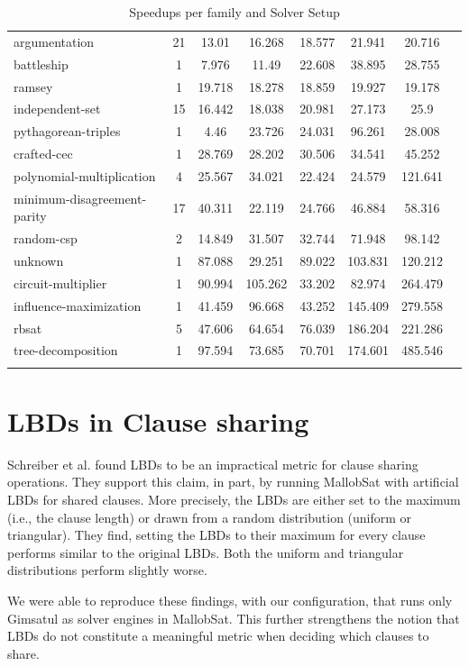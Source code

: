 \documentclass[12pt,a4paper,twoside]{scrartcl}
\numberwithin{equation}{section}
\begin{document}
\begin{longtable}{ lccccccc }
  argumentation	&	21	&	13.01	&	16.268	&	18.577	&	21.941	&	20.716	\\
  battleship	&	1	&	7.976	&	11.49	&	22.608	&	38.895	&	28.755	\\
  ramsey	&	1	&	19.718	&	18.278	&	18.859	&	19.927	&	19.178	\\
  independent-set	&	15	&	16.442	&	18.038	&	20.981	&	27.173	&	25.9	\\
  pythagorean-triples	&	1	&	4.46	&	23.726	&	24.031	&	96.261	&	28.008	\\
  crafted-cec	&	1	&	28.769	&	28.202	&	30.506	&	34.541	&	45.252	\\
  polynomial-multiplication	&	4	&	25.567	&	34.021	&	22.424	&	24.579	&	121.641	\\
  minimum-disagreement-parity	&	17	&	40.311	&	22.119	&	24.766	&	46.884	&	58.316	\\
  random-csp	&	2	&	14.849	&	31.507	&	32.744	&	71.948	&	98.142	\\
  unknown	&	1	&	87.088	&	29.251	&	89.022	&	103.831	&	120.212	\\
  circuit-multiplier	&	1	&	90.994	&	105.262	&	33.202	&	82.974	&	264.479	\\
  influence-maximization	&	1	&	41.459	&	96.668	&	43.252	&	145.409	&	279.558	\\
  rbsat	&	5	&	47.606	&	64.654	&	76.039	&	186.204	&	221.286	\\
  tree-decomposition	&	1	&	97.594	&	73.685	&	70.701	&	174.601	&	485.546	\\
  \bottomrule
  \caption{Speedups per family and Solver Setup}
  \label{tab:speedupsFamiliesComplete}
\end{longtable}

\section{LBDs in Clause sharing}

Schreiber et al. \cite{searchOnlyPaper} found LBDs to be an impractical metric for clause sharing operations. They support this claim, in part, by running MallobSat with artificial LBDs for shared clauses. More precisely, the LBDs are either set to the maximum (i.e., the clause length) or drawn from a random distribution (uniform or triangular). They find, setting the LBDs to their maximum for every clause performs similar to the original LBDs. Both the uniform and triangular distributions perform slightly worse.

We were able to reproduce these findings, with our configuration, that runs only Gimsatul as solver engines in MallobSat. This further strengthens the notion that LBDs do not constitute a meaningful metric when deciding which clauses to share.



\end{document}

